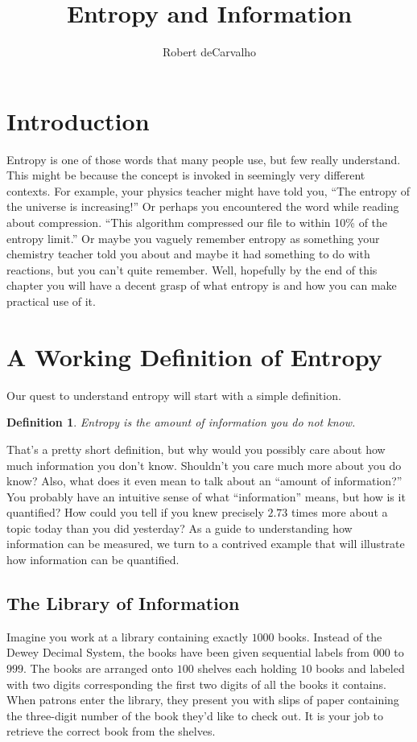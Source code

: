 \documentclass[11pt, oneside]{article}   	%
\title{Entropy and Information}
\author{Robert deCarvalho}
\date{}							%
\newtheorem{definition}{Definition}
\begin{document}
\maketitle


\section{Introduction}
Entropy is one of those words that many people use, but few really understand.
This might be because the concept is invoked in seemingly very different
contexts.  For example, your physics teacher might have told you, ``The entropy
of the universe is increasing!'' Or perhaps you encountered the word while
reading about compression. ``This algorithm compressed our file to within
10\% of the entropy limit.''  Or maybe you vaguely remember entropy as something
your chemistry teacher told you about and maybe it had something to do with
reactions, but you can't quite remember.  Well, hopefully by the end of this
chapter you will have a decent grasp of what entropy is and how you can make
practical use of it.


\section{A Working Definition of Entropy}
Our quest to understand entropy will start with a simple definition.
\begin{definition}
    Entropy is the amount of information you do not know.
\end{definition}
That's a pretty short definition, but why would you possibly care about how much
information you don't know.  Shouldn't you care much more about you do know?
Also, what does it even mean to talk about an ``amount of information?'' You
probably have an intuitive sense of what ``information'' means, but how is it
quantified?  How could you tell if you knew precisely $2.73$ times more about a
topic today than you did yesterday?  As a guide to understanding how information
can be measured, we turn to a contrived example that will illustrate how
information can be quantified.


\subsection{The Library of Information}
Imagine you work at a library containing exactly $1000$ books.  Instead of the
Dewey Decimal System, the books have been given sequential labels from $000$ to
$999$.  The books are arranged onto $100$ shelves each holding $10$ books and
labeled with  two digits corresponding the first two digits of all the books
it contains.  When patrons enter the library, they present you with slips of
paper containing the three-digit number of the book they'd like to check out.
It is your job to retrieve the correct book from the shelves.
\end{document}
